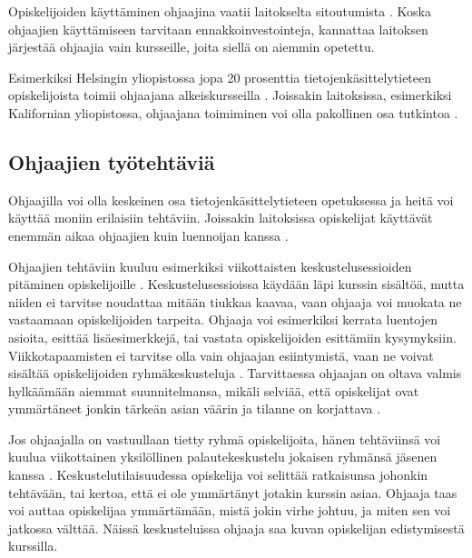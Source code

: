 \documentclass[finnish]{tktltiki2}
\theoremstyle{definition}
\theoremstyle{remark}
\begin{document}
Opiskelijoiden käyttäminen ohjaajina vaatii laitokselta sitoutumista \cite{Kopp00}. Koska ohjaajien käyttämiseen tarvitaan ennakkoinvestointeja, kannattaa laitoksen järjestää ohjaajia vain kursseille, joita siellä on aiemmin opetettu. \par

Esimerkiksi Helsingin yliopistossa jopa 20 prosenttia tie\-to\-jen\-kä\-sit\-te\-ly\-tie\-teen opiskelijoista toimii ohjaajana alkeiskursseilla \cite{Vihavainen}. Joissakin laitoksissa, esimerkiksi Kalifornian yliopistossa, ohjaajana toimiminen voi olla pakollinen osa tutkintoa \cite{Kay95}.  \par


\subsection{Ohjaajien työtehtäviä}
Ohjaajilla voi olla keskeinen osa tietojenkäsittelytieteen opetuksessa ja heitä voi käyttää moniin erilaisiin tehtäviin. Joissakin laitoksissa opiskelijat käyttävät enemmän aikaa ohjaajien kuin luennoijan kanssa \cite{Patitsas12_3}.\par

Ohjaajien tehtäviin kuuluu esimerkiksi viikottaisten keskustelusessioiden pitäminen opiskelijoille \cite{Reges88}. Keskustelusessioissa käydään läpi kurssin sisältöä, mutta niiden ei tarvitse noudattaa mitään tiukkaa kaavaa, vaan ohjaaja voi muokata ne vastaamaan opiskelijoiden tarpeita. Ohjaaja voi esimerkiksi kerrata luentojen asioita, esittää lisäesimerkkejä, tai vastata opiskelijoiden esittämiin kysymyksiin. Viikkotapaamisten ei tarvitse olla vain ohjaajan esiintymistä, vaan ne voivat sisältää opiskelijoiden ryhmäkeskusteluja \cite{Decker06}. Tarvittaessa ohjaajan on oltava valmis hylkäämään aiemmat suunnitelmansa, mikäli selviää, että opiskelijat ovat ymmärtäneet jonkin tärkeän asian väärin ja tilanne on korjattava \cite{Reges88}. \par

Jos ohjaajalla on vastuullaan tietty ryhmä opiskelijoita, hänen tehtäviinsä voi kuulua viikottainen yksilöllinen palautekeskustelu jokaisen ryhmänsä jäsenen kanssa \cite{Reges88,Reges03}. Keskustelutilaisuudessa opiskelija voi selittää ratkaisunsa johonkin tehtävään, tai kertoa, että ei ole ymmärtänyt jotakin kurssin asiaa. Ohjaaja taas voi auttaa opiskelijaa ymmärtämään, mistä jokin virhe johtuu, ja miten sen voi jatkossa välttää. Näissä keskusteluissa ohjaaja saa kuvan opiskelijan edistymisestä kurssilla.  \par
\end{document}

